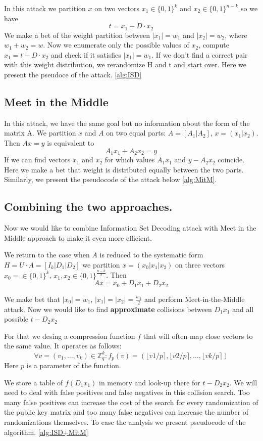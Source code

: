 \documentclass[12pt]{article}
\newcommand{\ZZ}{\mathbb{Z}}
\begin{document}
In this attack we partition $x$ on two vectors $x_1 \in \{0,1\}^{k}$ and  $x_2  \in \{0,1\}^{n-k}$ so we have
\[
t = x_1 + D \cdot x_2
\]
We make a bet of the weight partition between $|x_1| = w_1$ and $|x_2| = w_2$, where $w_1 + w_2 = w$. Now we enumerate only the possible values of $x_2$, compute $x_1 = t - D \cdot x_2$ and check if it satisfies $|x_1| = w_1$. If we don't find a correct pair with this weight distribution, we rerandomize H and t and start over. Here we present the pseudoce of the attack. \ref{alg:ISD}

\subsection{Meet in the Middle}
In this attack, we have the same goal but no information about the form of the matrix A.
We partition $x$ and $A$ on two equal parts: $A = [A_1 | A_2]$, $x = (x_1 | x_2)$.
Then $Ax = y$ is equivalent to
\[
    A_1x_1 + A_2x_2 = y
\]
If we can find vectors $x_1$ and $x_2$ for which values $A_1x_1$ and $y - A_2x_2$ coincide. Here we make a bet that weight is distributed equally between the two parts. Similarly, we present the pseudocode of the attack below \ref{alg:MitM}.

\subsection{Combining the two approaches.}

Now we would like to combine Information Set Decoding attack with Meet in the Middle approach to make it even more efficient.

We return to the case when $A$ is reduced to the systematic form $H = U \cdot A = [I_{k}| D_1 | D_2]$ we partition $x = (x_0 |x_1 |x_2)$ on three vectors $x_0 = \in \{0,1\}^{k}$, $x_1,x_2 \in \{0,1\}^{\frac{n-k}{2}}$. Then
\[
  Ax = x_0 + D_1x_1 + D_2x_2
\]

We make bet that $|x_0| = w_1$, $|x_1| = |x_2| = \frac{w_2}{2}$ and perform Meet-in-the-Middle attack. Now we would like to find \textbf{approximate} collisions between $D_1x_1$ and all possible $t - D_2x_2$

For that we desing a compression function $f$ that will often map close vectors to the same value. It operates as follows:
\[
\forall v = (v_1, \dots , v_k)\in \ZZ_{q}^{k}: f_{p}(v) = (\lfloor v1/p \rceil, \lfloor v2/p \rceil, \dots, \lfloor vk/p \rceil)
\]
Here $p$ is a parameter of the function.

We store a table of $f(D_1x_1)$ in memory and look-up there for $t - D_2x_2$. We will need to deal with false positives and false negatives in this collision search. Too many false positives can increase the cost of the search for every randomization of the public key matrix and too many false negatives can increase the number of randomizations themselves. To ease the analysis we present pseudocode of the algorithm. \ref{alg:ISD+MitM}
\end{document}
